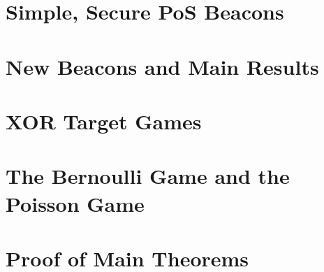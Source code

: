 \chapter{Simple, Secure PoS Beacons}\label{sec:xorgames-intro}


\chapter{New Beacons and Main Results}
\label{sec:xorgames-model}

\chapter{XOR Target Games}\label{sec:xor-games}


\chapter{The Bernoulli Game and the Poisson Game}\label{app:bernoulli}


% 

% 

\chapter{Proof of Main Theorems}\label{sec:main-thm-proofs}





